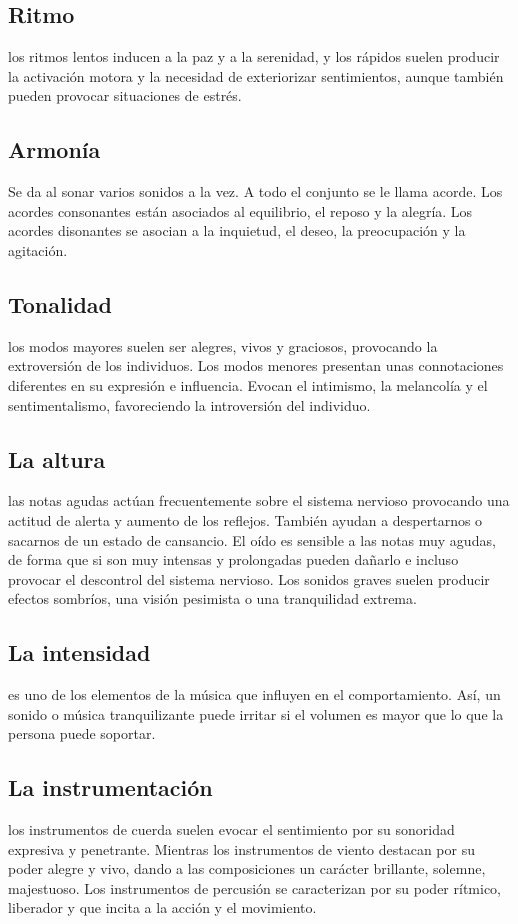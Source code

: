 \documentclass{bmcart}
\begin{document}
\subsection*{Ritmo}
los ritmos lentos inducen a la paz y a la serenidad, y los rápidos suelen producir la activación motora y la necesidad de exteriorizar sentimientos, aunque también pueden provocar situaciones de estrés.
\subsection*{Armonía}
Se da al sonar varios sonidos a la vez. A todo el conjunto se le llama acorde. Los acordes consonantes están asociados al equilibrio, el reposo y la alegría. Los acordes disonantes se asocian a la inquietud, el deseo, la preocupación y la agitación.
\subsection*{Tonalidad}
los modos mayores suelen ser alegres, vivos y graciosos, provocando la extroversión de los individuos. Los modos menores presentan unas connotaciones diferentes en su expresión e influencia. Evocan el intimismo, la melancolía y el sentimentalismo, favoreciendo la introversión del individuo.
\subsection*{La altura}
las notas agudas actúan frecuentemente sobre el sistema nervioso provocando una actitud de alerta y aumento de los reflejos. También ayudan a despertarnos o sacarnos de un estado de cansancio. El oído es sensible a las notas muy agudas, de forma que si son muy intensas y prolongadas pueden dañarlo e incluso provocar el descontrol del sistema nervioso. Los sonidos graves suelen producir efectos sombríos, una visión pesimista o una tranquilidad extrema.
\subsection*{La intensidad}
es uno de los elementos de la música que influyen en el comportamiento. Así, un sonido o música tranquilizante puede irritar si el volumen es mayor que lo que la persona puede soportar.
\subsection*{La instrumentación}
los instrumentos de cuerda suelen evocar el sentimiento por su sonoridad expresiva y penetrante. Mientras los instrumentos de viento destacan por su poder alegre y vivo, dando a las composiciones un carácter brillante, solemne, majestuoso. Los instrumentos de percusión se caracterizan por su poder rítmico, liberador y que incita a la acción y el movimiento.
\end{document}
